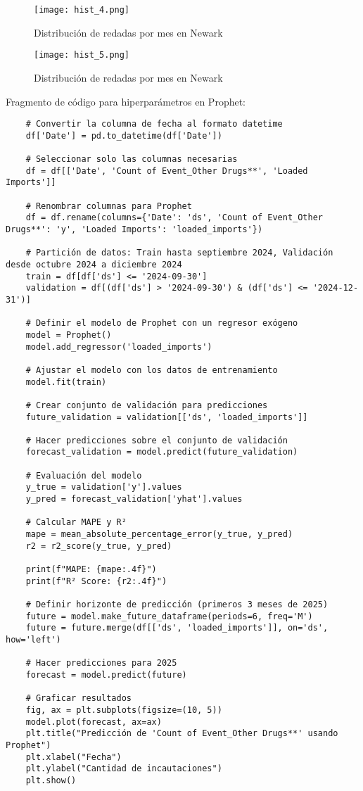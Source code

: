 \documentclass[12pt]{article}
\begin{document}
\begin{figure}[H]
	\caption{\label{hist_4} Distribución de redadas por mes en Newark}
	\centering
	\hspace*{1cm}
	\texttt{[image: hist\_4.png]}
\end{figure}

\begin{figure}[H]
 	\caption{\label{hist_5} Distribución de redadas por mes en Newark}
 	\centering
 	\hspace*{1cm}
 	\texttt{[image: hist\_5.png]}
\end{figure}

Fragmento de código para hiperparámetros en Prophet:
\begin{verbatim}
	# Convertir la columna de fecha al formato datetime
	df['Date'] = pd.to_datetime(df['Date'])
	
	# Seleccionar solo las columnas necesarias
	df = df[['Date', 'Count of Event_Other Drugs**', 'Loaded Imports']]
	
	# Renombrar columnas para Prophet
	df = df.rename(columns={'Date': 'ds', 'Count of Event_Other Drugs**': 'y', 'Loaded Imports': 'loaded_imports'})
	
	# Partición de datos: Train hasta septiembre 2024, Validación desde octubre 2024 a diciembre 2024
	train = df[df['ds'] <= '2024-09-30']
	validation = df[(df['ds'] > '2024-09-30') & (df['ds'] <= '2024-12-31')]
	
	# Definir el modelo de Prophet con un regresor exógeno
	model = Prophet()
	model.add_regressor('loaded_imports')
	
	# Ajustar el modelo con los datos de entrenamiento
	model.fit(train)
	
	# Crear conjunto de validación para predicciones
	future_validation = validation[['ds', 'loaded_imports']]
	
	# Hacer predicciones sobre el conjunto de validación
	forecast_validation = model.predict(future_validation)
	
	# Evaluación del modelo
	y_true = validation['y'].values
	y_pred = forecast_validation['yhat'].values
	
	# Calcular MAPE y R²
	mape = mean_absolute_percentage_error(y_true, y_pred)
	r2 = r2_score(y_true, y_pred)
	
	print(f"MAPE: {mape:.4f}")
	print(f"R² Score: {r2:.4f}")
	
	# Definir horizonte de predicción (primeros 3 meses de 2025)
	future = model.make_future_dataframe(periods=6, freq='M')
	future = future.merge(df[['ds', 'loaded_imports']], on='ds', how='left')
	
	# Hacer predicciones para 2025
	forecast = model.predict(future)
	
	# Graficar resultados
	fig, ax = plt.subplots(figsize=(10, 5))
	model.plot(forecast, ax=ax)
	plt.title("Predicción de 'Count of Event_Other Drugs**' usando Prophet")
	plt.xlabel("Fecha")
	plt.ylabel("Cantidad de incautaciones")
	plt.show()
	
	
\end{verbatim}
\end{document}

